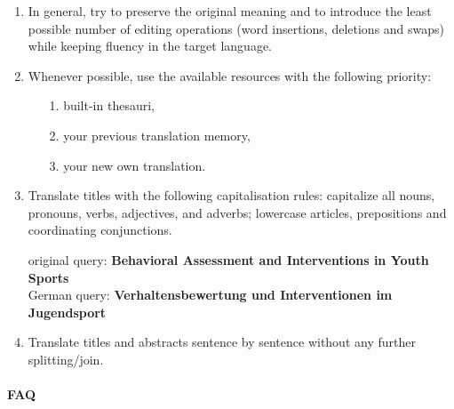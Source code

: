 \documentclass[a4paper,10pt]{article}
\newcommand{\ex}[1]{\begin{tcolorbox}[]{#1}\end{tcolorbox}}
\begin{document}
\begin{enumerate}

 \item In general, try to preserve the original meaning and to introduce the least possible number of editing operations (word insertions, deletions and swaps) while keeping fluency in the target language. 
 
 \item Whenever possible, use the available resources with the following priority: 
  \begin{enumerate}
 \item[1.] built-in thesauri, 
 \item[2.] your previous translation memory,
 \item[3.] your new own translation. 
 \end{enumerate}
 \item Translate titles with the following capitalisation rules: capitalize all nouns, pronouns, verbs, adjectives, and adverbs; lowercase articles, prepositions and coordinating conjunctions.
  \ex{original query: {\bf Behavioral Assessment and Interventions in Youth Sports}  \\
     German query: {\bf Verhaltensbewertung und Interventionen im Jugendsport} }

 
 \item Translate titles and abstracts sentence by sentence without any further splitting/join.
  
\end{enumerate}



\paragraph{FAQ}
\end{document}
